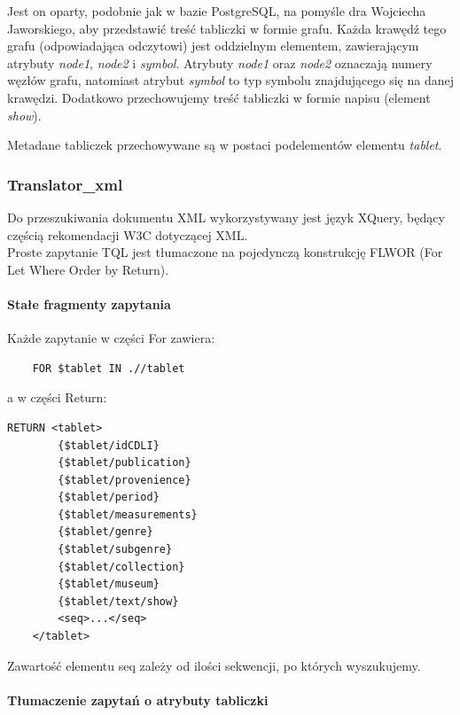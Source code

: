 Jest on oparty, podobnie jak w bazie PostgreSQL, na pomyśle dra Wojciecha Jaworskiego, 
 aby przedstawić treść tabliczki w formie grafu. 
Każda krawędź tego grafu (odpowiadająca odczytowi) jest oddzielnym elementem, zawierającym atrybuty \textit{node1}, \textit{node2} 
i \textit{symbol}.
Atrybuty \textit{node1} oraz \textit{node2} oznaczają numery węzłów grafu,
natomiast atrybut \textit{symbol} to typ symbolu znajdującego się na danej krawędzi. 
Dodatkowo przechowujemy treść tabliczki w formie napisu (element \textit{show}). 

Metadane tabliczek przechowywane są w postaci podelementów elementu \textit{tablet}.


\subsubsection{Translator\_xml}
Do przeszukiwania dokumentu XML wykorzystywany jest język XQuery, będący częścią rekomendacji W3C dotyczącej XML.\\
Proste zapytanie TQL jest tłumaczone na pojedynczą konstrukcję FLWOR (For Let Where Order by Return).\\

\paragraph{Stałe fragmenty zapytania}
Każde zapytanie w części For zawiera:
	\begin{verbatim}
	FOR $tablet IN .//tablet
\end{verbatim}
a w części Return:
  \begin{verbatim}RETURN <tablet>
		{$tablet/idCDLI}
		{$tablet/publication}
		{$tablet/provenience}
		{$tablet/period}
		{$tablet/measurements}
		{$tablet/genre}
		{$tablet/subgenre}
		{$tablet/collection}
		{$tablet/museum}
		{$tablet/text/show}
		<seq>...</seq>
	</tablet>
\end{verbatim}
Zawartość elementu seq zależy od ilości sekwencji, po których wyszukujemy. 

\paragraph{Tłumaczenie zapytań o atrybuty tabliczki}

